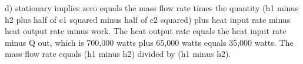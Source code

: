 d) stationary implies zero equals the mass flow rate times the quantity (h1 minus h2 plus half of c1 squared minus half of c2 squared) plus heat input rate minus heat output rate minus work. The heat output rate equals the heat input rate minus Q out, which is 700,000 watts plus 65,000 watts equals 35,000 watts. The mass flow rate equals (h1 minus h2) divided by (h1 minus h2).
